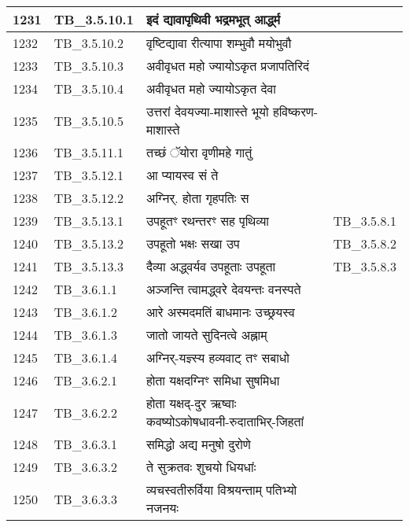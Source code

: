 \documentclass[17pt]{extarticle}
\begin{document}
\begin{longtable}{||p{0.4in}||p{0.9in}||p{4.0in}||p{0.9in}||}
        \hline
            1231 & TB\_3.5.10.1 & इदं द्यावापृथिवी भद्रमभूत् आर्द्ध्म &      \\
        \hline
            1232 & TB\_3.5.10.2 & वृष्टिद्यावा रीत्यापा शम्भुवौ मयोभुवौ &      \\
        \hline
            1233 & TB\_3.5.10.3 & अवीवृधत महो ज्यायोऽकृत प्रजापतिरिदं &      \\
        \hline
            1234 & TB\_3.5.10.4 & अवीवृधत महो ज्यायोऽकृत देवा &      \\
        \hline
            1235 & TB\_3.5.10.5 & उत्तरां देवयज्या{-}माशास्ते भूयो हविष्करण{-}माशास्ते &      \\
        \hline
            1236 & TB\_3.5.11.1 & तच्छं ॅयोरा वृणीमहे गातुं &      \\
        \hline
            1237 & TB\_3.5.12.1 & आ प्यायस्व सं ते &      \\
        \hline
            1238 & TB\_3.5.12.2 & अग्निर्. होता गृहपतिः स &      \\
        \hline
            1239 & TB\_3.5.13.1 & उपहूतꣳ रथन्तरꣳ सह पृथिव्या & TB\_3.5.8.1        \\
        \hline
            1240 & TB\_3.5.13.2 & उपहूतो भक्षः सखा उप & TB\_3.5.8.2        \\
        \hline
            1241 & TB\_3.5.13.3 & दैव्या अद्ध्वर्यव उपहूताः उपहूता & TB\_3.5.8.3        \\
        \hline
            1242 & TB\_3.6.1.1 & अञ्जन्ति त्वामद्ध्वरे देवयन्तः वनस्पते &      \\
        \hline
            1243 & TB\_3.6.1.2 & आरे अस्मदमतिं बाधमानः उच्छ्रयस्व &      \\
        \hline
            1244 & TB\_3.6.1.3 & जातो जायते सुदिनत्वे अह्नाम् &      \\
        \hline
            1245 & TB\_3.6.1.4 & अग्निर्{-}यज्ञ्स्य हव्यवाट् तꣳ सबाधो &      \\
        \hline
            1246 & TB\_3.6.2.1 & होता यक्षदग्निꣳ समिधा सुषमिधा &      \\
        \hline
            1247 & TB\_3.6.2.2 & होता यक्षद्{-}दुर ऋष्वाः कवष्योऽकोषधावनी{-}रुदाताभिर्{-}जिहतां &      \\
        \hline
            1248 & TB\_3.6.3.1 & समिद्धो अद्य मनुषो दुरोणे &      \\
        \hline
            1249 & TB\_3.6.3.2 & ते सुक्रतवः शुचयो धियधांः &      \\
        \hline
            1250 & TB\_3.6.3.3 & व्यचस्वतीरुर्विया विश्रयन्ताम् पतिभ्यो नजनयः &      \\

\end{longtable}
\end{document}
